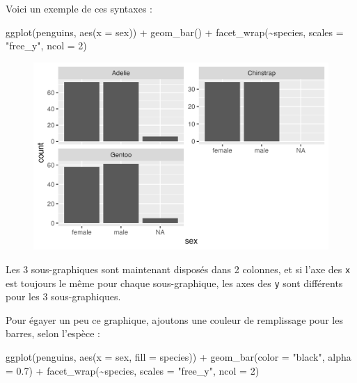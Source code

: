 \documentclass[
  letterpaper,
  DIV=11,
  numbers=noendperiod]{scrreprt}
\newenvironment{Shaded}{\begin{snugshade}}{\end{snugshade}}
\newcommand{\AttributeTok}[1]{\textcolor[rgb]{0.40,0.45,0.13}{#1}}
\newcommand{\DecValTok}[1]{\textcolor[rgb]{0.68,0.00,0.00}{#1}}
\newcommand{\FloatTok}[1]{\textcolor[rgb]{0.68,0.00,0.00}{#1}}
\newcommand{\FunctionTok}[1]{\textcolor[rgb]{0.28,0.35,0.67}{#1}}
\newcommand{\NormalTok}[1]{\textcolor[rgb]{0.00,0.23,0.31}{#1}}
\newcommand{\SpecialCharTok}[1]{\textcolor[rgb]{0.37,0.37,0.37}{#1}}
\newcommand{\StringTok}[1]{\textcolor[rgb]{0.13,0.47,0.30}{#1}}
\begin{document}
Voici un exemple de ces syntaxes :

\begin{Shaded}
\begin{Highlighting}[]
\FunctionTok{ggplot}\NormalTok{(penguins, }\FunctionTok{aes}\NormalTok{(}\AttributeTok{x =}\NormalTok{ sex)) }\SpecialCharTok{+}
  \FunctionTok{geom\_bar}\NormalTok{() }\SpecialCharTok{+}
  \FunctionTok{facet\_wrap}\NormalTok{(}\SpecialCharTok{\textasciitilde{}}\NormalTok{species, }\AttributeTok{scales =} \StringTok{"free\_y"}\NormalTok{, }\AttributeTok{ncol =} \DecValTok{2}\NormalTok{)}
\end{Highlighting}
\end{Shaded}

\begin{figure}[H]

{\centering \includegraphics{./03-visualization_files/figure-pdf/unnamed-chunk-62-1.png}

}

\end{figure}

Les 3 sous-graphiques sont maintenant disposés dans 2 colonnes, et si
l'axe des \texttt{x} est toujours le même pour chaque sous-graphique,
les axes des \texttt{y} sont différents pour les 3 sous-graphiques.

Pour égayer un peu ce graphique, ajoutons une couleur de remplissage
pour les barres, selon l'espèce :

\begin{Shaded}
\begin{Highlighting}[]
\FunctionTok{ggplot}\NormalTok{(penguins, }\FunctionTok{aes}\NormalTok{(}\AttributeTok{x =}\NormalTok{ sex, }\AttributeTok{fill =}\NormalTok{ species)) }\SpecialCharTok{+}
  \FunctionTok{geom\_bar}\NormalTok{(}\AttributeTok{color =} \StringTok{"black"}\NormalTok{, }\AttributeTok{alpha =} \FloatTok{0.7}\NormalTok{) }\SpecialCharTok{+}
  \FunctionTok{facet\_wrap}\NormalTok{(}\SpecialCharTok{\textasciitilde{}}\NormalTok{species, }\AttributeTok{scales =} \StringTok{"free\_y"}\NormalTok{, }\AttributeTok{ncol =} \DecValTok{2}\NormalTok{)}
\end{Highlighting}
\end{Shaded}
\end{document}

